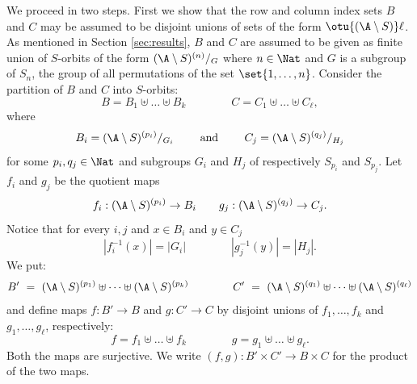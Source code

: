 We proceed in two steps.
First we show that the row and column index sets $B$ and $C$
may be assumed to be disjoint unions of sets of the form $\otu {(\A\setminus S)} \ell$.
As mentioned in Section \ref{sec:results},
$B$ and $C$ are assumed to be given as finite union of $S$-orbits of the form $(\A \setminus S)^{(n)}/_G$ where $n \in \Nat$ and $G$ is a subgroup of $S_n$, the group of all permutations of the set $\set{1,\dots,n}$.
Consider the partition of $B$ and $C$ into $S$-orbits:
\[
B = B_1 \uplus \dots \uplus B_k
\qquad\qquad
C = C_1 \uplus \dots \uplus C_{\ell},
\]
where
\[
B_i = (\A \setminus S)^{(p_i)}/_{G_i}
\qquad \text{ and }
\qquad
C_j = (\A \setminus S)^{(q_j)}/_{H_j}
\]
for some $p_i,q_j \in \Nat$ and subgroups $G_i$ and $H_j$ of respectively $S_{p_i}$ and $S_{p_j}$.
Let $f_i$ and $g_j$ be the quotient maps
\[
f_i : (\A \setminus S)^{(p_i)} \to B_i \qquad
g_j : (\A \setminus S)^{(q_j)} \to C_j.
\]
Notice that for every $i,j$ and $x \in B_i$ and $y \in C_j$
\begin{equation}\label{eq:const size preimage}
|f_i^{-1}(x)| = |G_i| \qquad\qquad
|g_j^{-1}(y)| = |H_j|.
\end{equation}
%
%
%
%
%
We put:
\begin{align} \label{eq:BCdef}
\begin{aligned}
B' \  = \ (\A \setminus S)^{(p_1)} \uplus \dots \uplus (\A \setminus S)^{(p_k)} \qquad\qquad
C' \  = \ (\A \setminus S)^{(q_1)} \uplus \dots \uplus (\A \setminus S)^{(q_{\ell})}
\end{aligned}
\end{align}
and define maps $f : B' \to B$ and $g: C' \to C$ by disjoint unions of $f_1, \ldots, f_k$ and
$g_1, \ldots, g_\ell$, respectively:
\[
f = f_1 \uplus \dots \uplus f_k
\qquad\qquad
g = g_1 \uplus \dots \uplus g_{\ell}.
\]
Both the maps are surjective.
We write $(f, g): B'\times C' \to B\times C$ for the product of the two maps.
